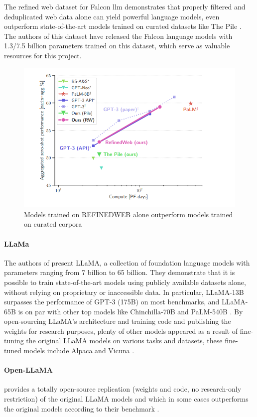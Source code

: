 \documentclass[a4paper,12pt]{article}
\begin{document}
The refined web dataset for Falcon llm \cite{falcondataset} demonstrates that properly filtered and deduplicated web data alone can yield powerful language models, 
even outperform state-of-the-art models trained on curated datasets like The Pile \cite{pile}. 
The authors of this dataset\cite{falcondataset} have released the Falcon \cite{falcon} language models with 1.3/7.5 billion parameters trained on this dataset, 
which serve as valuable resources for this project.

\begin{figure}[htbp]
	\centering
	\includegraphics[width=.5\linewidth]{figures/falcon.png}
	\caption{Models trained on REFINEDWEB \cite{falcondataset} alone outperform models trained on curated corpora}
	\label{fig:falcon}
\end{figure}

\paragraph*{LLaMa}
The authors of \cite{llama} present LLaMA, a collection of foundation language models with parameters ranging from 7 billion to 65 billion. 
They demonstrate that it is possible to train state-of-the-art models using publicly available datasets alone, without relying on proprietary or inaccessible data. 
In particular, LLaMA-13B surpasses the performance of GPT-3 (175B) \cite{gpt3} on most benchmarks, and LLaMA-65B is on par with other top models like Chinchilla-70B \cite{chinchilla} and PaLM-540B \cite{palm}. 
By open-sourcing LLaMA's architecture and training code and publishing the weights for research purposes, plenty of other models appeared as a result of fine-tuning the original LLaMA models on various tasks and datasets, 
these fine-tuned models include Alpaca \cite{alpaca} and Vicuna \cite{vicuna}.     

\paragraph*{Open-LLaMA} \cite{openllama} provides a totally open-source replication (weights and code, no research-only restriction) of the original LLaMA \cite{llama} models 
and which in some cases outperforms the original models according to their benchmark \cite{openllama}.
\end{document}
